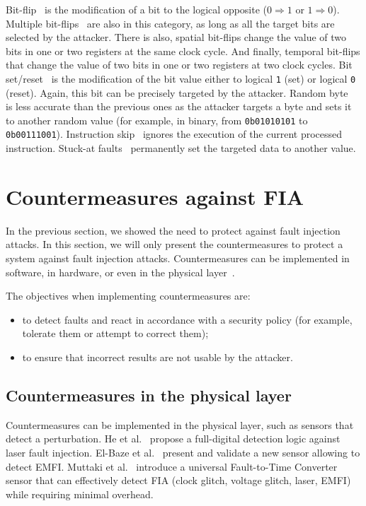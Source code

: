 Bit-flip~\cite{CMDMRD-19-host} is the modification of a bit to the logical opposite ($0 \Rightarrow 1$ or $1 \Rightarrow 0$).
Multiple bit-flips~\cite{CGVCBLC-22-cardis} are also in this category, as long as all the target bits are selected by the attacker.
There is also, spatial bit-flips change the value of two bits in one or two registers at the same clock cycle.
And finally, temporal bit-flips that change the value of two bits in one or two registers at two clock cycles.
Bit set/reset~\cite{BS-03-financialcrypto} is the modification of the bit value either to logical \texttt{1} (set) or logical \texttt{0} (reset). Again, this bit can be precisely targeted by the attacker.
Random byte~\cite{LFZD-16-fdtc} is less accurate than the previous ones as the attacker targets a byte and sets it to another random value (for example, in binary, from \texttt{0b01010101} to \texttt{0b00111001}).
Instruction skip~\cite{MDPRD-20-dtis} ignores the execution of the current processed instruction.
Stuck-at faults~\cite{MABGHMRSYV-18-fdtc} permanently set the targeted data to another value.


\section{Countermeasures against FIA}
\label{section:countermeasuresAgainstFIA}
In the previous section, we showed the need to protect against fault injection attacks.
In this section, we will only present the countermeasures to protect a system against fault injection attacks.
Countermeasures can be implemented in software, in hardware, or even in the physical layer~\cite{BCNTW-06-procieee}.

The objectives when implementing countermeasures are:
\begin{itemize}
    \item to detect faults and react in accordance with a security policy (for example, tolerate them or attempt to correct them);
    \item to ensure that incorrect results are not usable by the attacker. 
\end{itemize}

\subsection{Countermeasures in the physical layer}
Countermeasures can be implemented in the physical layer, such as sensors that detect a perturbation. He et al.~\cite{HBB-16-space} propose a full-digital detection logic against laser fault injection. El-Baze et al.~\cite{ERM-16-date} present and validate a new sensor allowing to detect EMFI. Muttaki et al.~\cite{MZTF-22-host} introduce a universal Fault-to-Time Converter sensor that can effectively detect FIA (clock glitch, voltage glitch, laser, EMFI) while requiring minimal overhead.

